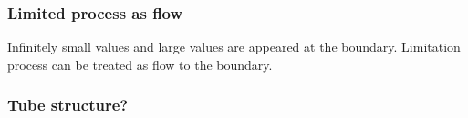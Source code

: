 \documentclass[aspectratio=169]{beamer}
\begin{document}
\begin{frame}
    \frametitle{Limited process as flow}
    Infinitely small values and large values are appeared at the boundary.
    Limitation process can be treated as flow to the boundary.
    \begin{figure}[ht]\centering
    \end{figure}
\end{frame}

\begin{frame}
    \frametitle{Tube structure?}
    \begin{figure}[ht]\centering
    \end{figure}
\end{frame}
\end{document}

